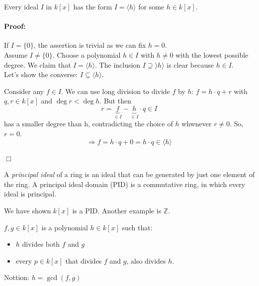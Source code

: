 \begin{corollary}[title = Corollary 1.5.4]
  Every ideal $I$ in $k[x]$ has the form $I = \langle h \rangle$ for some $h \in k[x]$. 

  \paragraph{Proof:}  If $I = \{0\}$, the assertion is trivial as we can fix $h = 0$. \\[0.3em]
  Assume  $I \neq \{0\}$. Choose a polynomial $h \in I$ with $h \neq 0$ with the lowest possible degree. We claim that $I = \langle h \rangle$. The inclusion $I \supseteq \rangle h \rangle$ 
  is clear because $h \in I$. \\[0.5em] 
  Let's show the converse: $I \subseteq \langle h \rangle$.  

  Consider any $f \in I$. We can use long division to divide $f$ by $h$: $f = h \cdot q + r$ with $q,r \in k[x]$ and $\deg r < \deg h$. 
  But then \[r = \underbrace{f}_{\in I} - \underbrace{h}_{\in I} \cdot q \in I\] has a smaller degree than h, contradicting the choice of $h$ whwnever $r \neq 0$. So, $r = 0$. 
  \[
    \Rightarrow f = h \cdot q + 0 = h \cdot q \in \langle h \rangle
  \]

    \begin{flushright}
      $\Box $
    \end{flushright}
\end{corollary} 

\begin{definition}[title = Definition 1.5.5]
  A \textit{principal ideal} of a ring is an ideal that can be generated by just one element of the ring. A principal ideal domain (PID) is a commutative ring, in which every 
  ideal is principal. 
\end{definition}

We have shown $k[x]$ is a PID. Another example is $\mathbb{Z}$. 

\begin{definition}[title = Definition 1.5.6 (Greatest Common Divisor (GCD))]
    $f, g \in k[x]$ is a polynomial $h \in k[x]$ such that: 
    \begin{itemize}
      \item[(i)] $h$ divides both $f$ and $g$ 
      \item[(ii)] every $p \in k[x]$ that divides $f$ and $g$, also divides $h$. 
    \end{itemize}
    Nottion: $h = \gcd(f,g)$
\end{definition}

